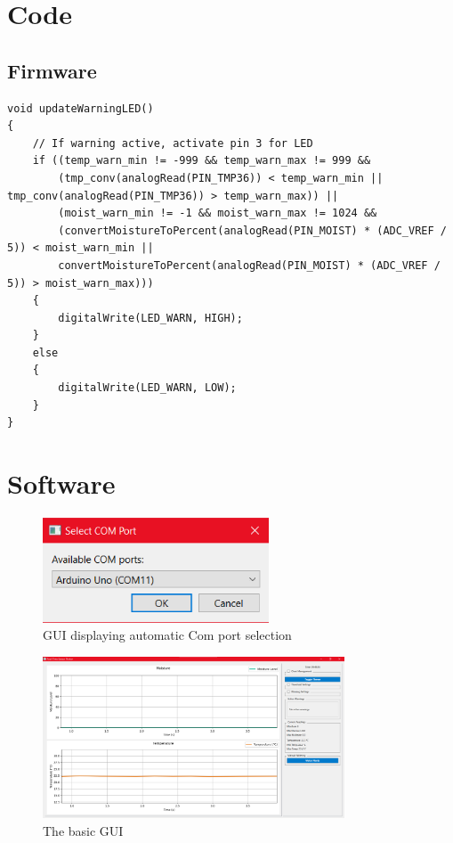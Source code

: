 \documentclass[a4paper,11pt]{article}
\begin{document}
\section{Code}
\subsection{Firmware}

\begin{lstlisting}[style=cpp-style, 
caption={LED warning light}, label={prog:LED}]
void updateWarningLED()
{
    // If warning active, activate pin 3 for LED
    if ((temp_warn_min != -999 && temp_warn_max != 999 &&
        (tmp_conv(analogRead(PIN_TMP36)) < temp_warn_min || tmp_conv(analogRead(PIN_TMP36)) > temp_warn_max)) ||
        (moist_warn_min != -1 && moist_warn_max != 1024 &&
        (convertMoistureToPercent(analogRead(PIN_MOIST) * (ADC_VREF / 5)) < moist_warn_min ||
        convertMoistureToPercent(analogRead(PIN_MOIST) * (ADC_VREF / 5)) > moist_warn_max)))
    {
        digitalWrite(LED_WARN, HIGH);
    }
    else
    {
        digitalWrite(LED_WARN, LOW);
    }
}
\end{lstlisting}

\section{Software}

\begin{figure}[H]
    \centering
    \includegraphics[width=0.6\textwidth]{1 - Select Comm Port.png}
    \caption{GUI displaying automatic Com port selection}
    \label{fig:port}
\end{figure}

\begin{figure}[H]
    \centering
    \includegraphics[width=0.8\textwidth]{2 - Blank Chart.png}
    \caption{The basic GUI}
    \label{fig:blank_gui}
\end{figure}
\end{document}
